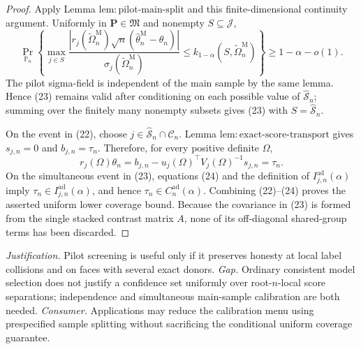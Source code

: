 \documentclass{article}
\begin{document}
\begin{proof}
Apply Lemma \(\mathrm{lem:pilot\text{-}main\text{-}split}\) and this finite-dimensional continuity argument.  Uniformly in \(\mathbf P\in\mathfrak M\) and nonempty \(S\subseteq\mathcal J\),
\[
 \Pr_{\mathbb P_n}\!\left\{
  \max_{j\in S}
  \frac{|r_j(\widetilde\Omega_n^{\mathrm M})
  \sqrt n(\widehat\theta_n^{\mathrm M}-\theta_n)|}
  {\sigma_j(\widetilde\Omega_n^{\mathrm M})}
  \le k_{1-\alpha}(S,\widetilde\Omega_n^{\mathrm M})
 \right\}
 \ge1-\alpha-o(1).
\tag{23}
\]
The pilot sigma-field is independent of the main sample by the same lemma.  Hence (23) remains valid after conditioning on each possible value of \(\widehat{\mathcal S}_n\); summing over the finitely many nonempty subsets gives (23) with \(S=\widehat{\mathcal S}_n\).

On the event in (22), choose \(j\in\widehat{\mathcal S}_n\cap\mathcal C_n\).  Lemma \(\mathrm{lem:exact\text{-}score\text{-}transport}\) gives \(s_{j,n}=0\) and \(b_{j,n}=\tau_n\).  Therefore, for every positive definite \(\Omega\),
\[
 r_j(\Omega)\theta_n
 =b_{j,n}-u_j(\Omega)^{\top}V_j(\Omega)^{-1}s_{j,n}
 =\tau_n.
\tag{24}
\]
On the simultaneous event in (23), equations (24) and the definition of \(I_{j,n}^{\mathrm{ad}}(\alpha)\) imply \(\tau_n\in I_{j,n}^{\mathrm{ad}}(\alpha)\), and hence \(\tau_n\in C_n^{\mathrm{ad}}(\alpha)\).  Combining (22)--(24) proves the asserted uniform lower coverage bound.  Because the covariance in (23) is formed from the single stacked contrast matrix \(A\), none of its off-diagonal shared-group terms has been discarded.
\end{proof}
\par\smallskip\noindent \textit{Justification.} Pilot screening is useful only if it preserves honesty at local label collisions and on faces with several exact donors. \textit{Gap.} Ordinary consistent model selection does not justify a confidence set uniformly over root-\(n\)-local score separations; independence and simultaneous main-sample calibration are both needed. \textit{Consumer.} Applications may reduce the calibration menu using prespecified sample splitting without sacrificing the conditional uniform coverage guarantee.
\end{document}
